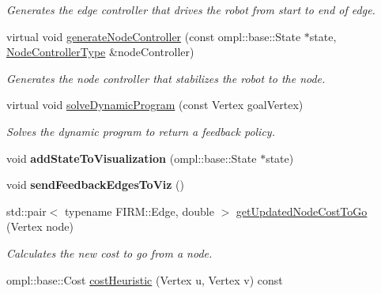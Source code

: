 \begin{DoxyCompactItemize}
\begin{DoxyCompactList}\small\item\em \-Generates the edge controller that drives the robot from start to end of edge. \end{DoxyCompactList}\item 
\hypertarget{class_f_i_r_m_a1856164aa0dba82e6cfad26a4ef5a7fe}{virtual void \hyperlink{class_f_i_r_m_a1856164aa0dba82e6cfad26a4ef5a7fe}{generate\-Node\-Controller} (const ompl\-::base\-::\-State $\ast$state, \hyperlink{class_controller}{\-Node\-Controller\-Type} \&node\-Controller)}\label{class_f_i_r_m_a1856164aa0dba82e6cfad26a4ef5a7fe}

\begin{DoxyCompactList}\small\item\em \-Generates the node controller that stabilizes the robot to the node. \end{DoxyCompactList}\item 
\hypertarget{class_f_i_r_m_a7ffdc57247b8f40899646195750b6a20}{virtual void \hyperlink{class_f_i_r_m_a7ffdc57247b8f40899646195750b6a20}{solve\-Dynamic\-Program} (const \-Vertex goal\-Vertex)}\label{class_f_i_r_m_a7ffdc57247b8f40899646195750b6a20}

\begin{DoxyCompactList}\small\item\em \-Solves the dynamic program to return a feedback policy. \end{DoxyCompactList}\item 
\hypertarget{class_f_i_r_m_a4003d4144f6c32e9eaba79f292ec9ce4}{void {\bfseries add\-State\-To\-Visualization} (ompl\-::base\-::\-State $\ast$state)}\label{class_f_i_r_m_a4003d4144f6c32e9eaba79f292ec9ce4}

\item 
\hypertarget{class_f_i_r_m_a8d9e316c11b1e2ff52b5ff65996d3a01}{void {\bfseries send\-Feedback\-Edges\-To\-Viz} ()}\label{class_f_i_r_m_a8d9e316c11b1e2ff52b5ff65996d3a01}

\item 
\hypertarget{class_f_i_r_m_a44321fba1c038c1f43ccfeccf9a1c44c}{std\-::pair$<$ typename \-F\-I\-R\-M\-::\-Edge, \*
double $>$ \hyperlink{class_f_i_r_m_a44321fba1c038c1f43ccfeccf9a1c44c}{get\-Updated\-Node\-Cost\-To\-Go} (\-Vertex node)}\label{class_f_i_r_m_a44321fba1c038c1f43ccfeccf9a1c44c}

\begin{DoxyCompactList}\small\item\em \-Calculates the new cost to go from a node. \end{DoxyCompactList}\item 
\hypertarget{class_f_i_r_m_a18aa9a3e98fd03d5654ffd3ebc7ca9ff}{ompl\-::base\-::\-Cost \hyperlink{class_f_i_r_m_a18aa9a3e98fd03d5654ffd3ebc7ca9ff}{cost\-Heuristic} (\-Vertex u, \-Vertex v) const }\label{class_f_i_r_m_a18aa9a3e98fd03d5654ffd3ebc7ca9ff}


\end{DoxyCompactItemize}
